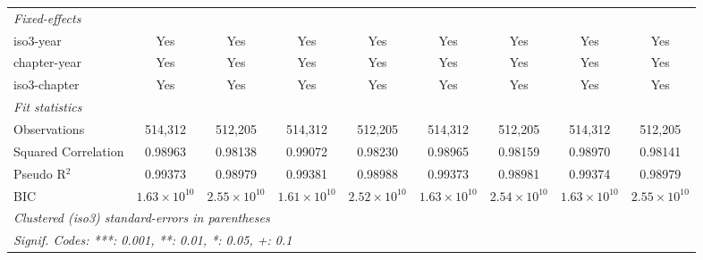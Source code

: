 \begin{tabular}{lcccccccc}
   \midrule
   \emph{Fixed-effects}\\
   iso3-year                                                                      & Yes                   & Yes                   & Yes                   & Yes                   & Yes                   & Yes                   & Yes                   & Yes\\  
   chapter-year                                                                   & Yes                   & Yes                   & Yes                   & Yes                   & Yes                   & Yes                   & Yes                   & Yes\\  
   iso3-chapter                                                                   & Yes                   & Yes                   & Yes                   & Yes                   & Yes                   & Yes                   & Yes                   & Yes\\  
   \midrule
   \emph{Fit statistics}\\
   Observations                                                                   & 514,312               & 512,205               & 514,312               & 512,205               & 514,312               & 512,205               & 514,312               & 512,205\\  
   Squared Correlation                                                            & 0.98963               & 0.98138               & 0.99072               & 0.98230               & 0.98965               & 0.98159               & 0.98970               & 0.98141\\  
   Pseudo R$^2$                                                                   & 0.99373               & 0.98979               & 0.99381               & 0.98988               & 0.99373               & 0.98981               & 0.99374               & 0.98979\\  
   BIC                                                                            & $1.63\times 10^{10}$  & $2.55\times 10^{10}$  & $1.61\times 10^{10}$  & $2.52\times 10^{10}$  & $1.63\times 10^{10}$  & $2.54\times 10^{10}$  & $1.63\times 10^{10}$  & $2.55\times 10^{10}$\\   
   \midrule \midrule
   \multicolumn{9}{l}{\emph{Clustered (iso3) standard-errors in parentheses}}\\
   \multicolumn{9}{l}{\emph{Signif. Codes: ***: 0.001, **: 0.01, *: 0.05, +: 0.1}}\\
\end{tabular}
\par\endgroup


